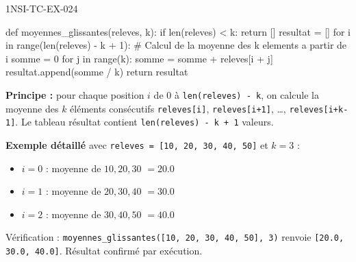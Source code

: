 \begin{corrige}{1NSI-TC-EX-024}
\begin{python}
def moyennes_glissantes(releves, k):
    if len(releves) < k:
        return []
    resultat = []
    for i in range(len(releves) - k + 1):
        # Calcul de la moyenne des k elements a partir de i
        somme = 0
        for j in range(k):
            somme = somme + releves[i + j]
        resultat.append(somme / k)
    return resultat
\end{python}

\textbf{Principe :} pour chaque position $i$ de 0 à \lstinline{len(releves) - k}, on calcule la moyenne des $k$ éléments consécutifs \lstinline{releves[i]}, \lstinline{releves[i+1]}, \dots, \lstinline{releves[i+k-1]}. Le tableau résultat contient \lstinline{len(releves) - k + 1} valeurs.

\textbf{Exemple détaillé} avec \lstinline{releves = [10, 20, 30, 40, 50]} et $k = 3$ :
\begin{itemize}
  \item $i=0$ : moyenne de $10, 20, 30$ $= 20.0$
  \item $i=1$ : moyenne de $20, 30, 40$ $= 30.0$
  \item $i=2$ : moyenne de $30, 40, 50$ $= 40.0$
\end{itemize}

Vérification : \lstinline{moyennes_glissantes([10, 20, 30, 40, 50], 3)} renvoie \lstinline{[20.0, 30.0, 40.0]}. Résultat confirmé par exécution.
\end{corrige}
